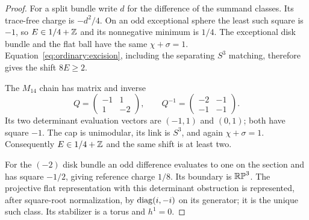 \begin{proof}
For a split bundle write $d$ for the difference of the summand
classes.  Its trace-free charge is $-d^2/4$.  On an odd
exceptional sphere the least such square is $-1$, so
$E\in1/4+\mathbb Z$ and its nonnegative minimum is $1/4$.
The exceptional disk bundle and the flat ball have the same
$\chi+\sigma=1$.  Equation~\eqref{eq:ordinary:excision},
including the separating $S^3$ matching, therefore gives
the shift $8E\ge2$.

The $M_{14}$ chain has matrix and inverse
\[
 Q=\begin{pmatrix}-1&1\\1&-2\end{pmatrix},
 \qquad Q^{-1}=\begin{pmatrix}-2&-1\\-1&-1\end{pmatrix}.
\]
Its two determinant evaluation vectors are $(-1,1)$ and
$(0,1)$; both have square $-1$.  The cap is unimodular, its
link is $S^3$, and again $\chi+\sigma=1$.
Consequently $E\in1/4+\mathbb Z$ and the same shift is at least two.

For the $(-2)$ disk bundle an odd difference evaluates to one
on the section and has square $-1/2$, giving reference charge
$1/8$.  Its boundary is $\mathbb{RP}^3$.  The projective flat
representation with this determinant obstruction is represented,
after square-root normalization, by
$\operatorname{diag}(i,-i)$ on its generator; it is the unique such class.
Its stabilizer is a torus and $h^1=0$.


\end{proof}
